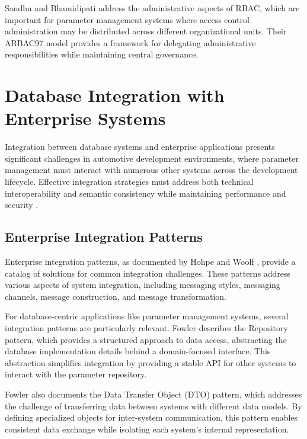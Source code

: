 Sandhu and Bhamidipati \cite{sandhu1997arbac97} address the administrative aspects of RBAC, which are important for parameter management systems where access control administration may be distributed across different organizational units. Their ARBAC97 model provides a framework for delegating administrative responsibilities while maintaining central governance.

\section{Database Integration with Enterprise Systems}
\label{sec:database-integration}

Integration between database systems and enterprise applications presents significant challenges in automotive development environments, where parameter management must interact with numerous other systems across the development lifecycle. Effective integration strategies must address both technical interoperability and semantic consistency while maintaining performance and security \cite{hohpe2002enterprise}.

\subsection{Enterprise Integration Patterns}
\label{subsec:enterprise-integration-patterns}

Enterprise integration patterns, as documented by Hohpe and Woolf \cite{hohpe2002enterprise}, provide a catalog of solutions for common integration challenges. These patterns address various aspects of system integration, including messaging styles, messaging channels, message construction, and message transformation.

For database-centric applications like parameter management systems, several integration patterns are particularly relevant. Fowler \cite{fowler2003patterns} describes the Repository pattern, which provides a structured approach to data access, abstracting the database implementation details behind a domain-focused interface. This abstraction simplifies integration by providing a stable API for other systems to interact with the parameter repository.

Fowler \cite{fowler2003patterns} also documents the Data Transfer Object (DTO) pattern, which addresses the challenge of transferring data between systems with different data models. By defining specialized objects for inter-system communication, this pattern enables consistent data exchange while isolating each system's internal representation.

